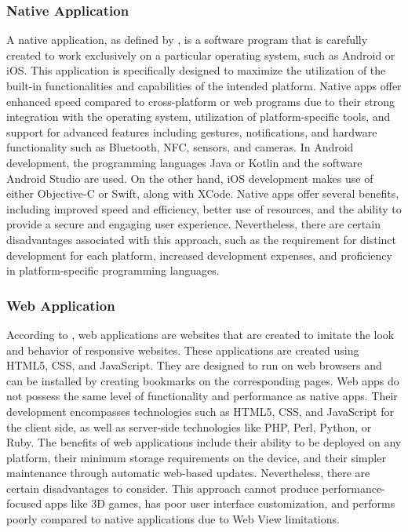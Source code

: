 \subsubsection{Native Application}
A native application, as defined by \textcite{syeed21}, is a software program that is carefully created to work exclusively on a particular operating system, such as Android or iOS. This application is specifically designed to maximize the utilization of the built-in functionalities and capabilities of the intended platform. Native apps offer enhanced speed compared to cross-platform or web programs due to their strong integration with the operating system, utilization of platform-specific tools, and support for advanced features including gestures, notifications, and hardware functionality such as Bluetooth, NFC, sensors, and cameras. In Android development, the programming languages Java or Kotlin and the software Android Studio are used. On the other hand, iOS development makes use of either Objective-C or Swift, along with XCode. Native apps offer several benefits, including improved speed and efficiency, better use of resources, and the ability to provide a secure and engaging user experience. Nevertheless, there are certain disadvantages associated with this approach, such as the requirement for distinct development for each platform, increased development expenses, and proficiency in platform-specific programming languages.

\subsubsection{Web Application}
According to \textcite{syeed21}, web applications are websites that are created to imitate the look and behavior of responsive websites. These applications are created using HTML5, CSS, and JavaScript. They are designed to run on web browsers and can be installed by creating bookmarks on the corresponding pages. Web apps do not possess the same level of functionality and performance as native apps. Their development encompasses technologies such as HTML5, CSS, and JavaScript for the client side, as well as server-side technologies like PHP, Perl, Python, or Ruby. The benefits of web applications include their ability to be deployed on any platform, their minimum storage requirements on the device, and their simpler maintenance through automatic web-based updates. Nevertheless, there are certain disadvantages to consider. This approach cannot produce performance-focused apps like 3D games, has poor user interface customization, and performs poorly compared to native applications due to Web View limitations.

